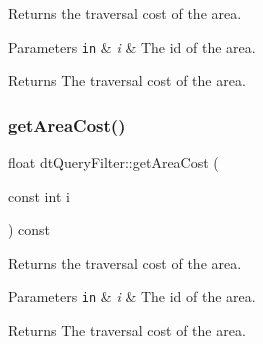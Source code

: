 Returns the traversal cost of the area. 
\begin{DoxyParams}[1]{Parameters}
\mbox{\tt in}  & {\em i} & The id of the area. \\
\hline
\end{DoxyParams}
\begin{DoxyReturn}{Returns}
The traversal cost of the area. 
\end{DoxyReturn}
\mbox{\label{classdtQueryFilter_a1e41582a45d2a10eb7e68740475e5665}} 
\subsubsection{\texorpdfstring{get\+Area\+Cost()}{getAreaCost()}\hspace{0.1cm}{\footnotesize\ttfamily [2/2]}}
{\footnotesize\ttfamily float dt\+Query\+Filter\+::get\+Area\+Cost (\begin{DoxyParamCaption}\item[{const int}]{i }\end{DoxyParamCaption}) const\hspace{0.3cm}{\ttfamily [inline]}}

Returns the traversal cost of the area. 
\begin{DoxyParams}[1]{Parameters}
\mbox{\tt in}  & {\em i} & The id of the area. \\
\hline
\end{DoxyParams}
\begin{DoxyReturn}{Returns}
The traversal cost of the area. 
\end{DoxyReturn}
\mbox{\label{classdtQueryFilter_a11d016505b732a1a013c3771a4157dea}} 
